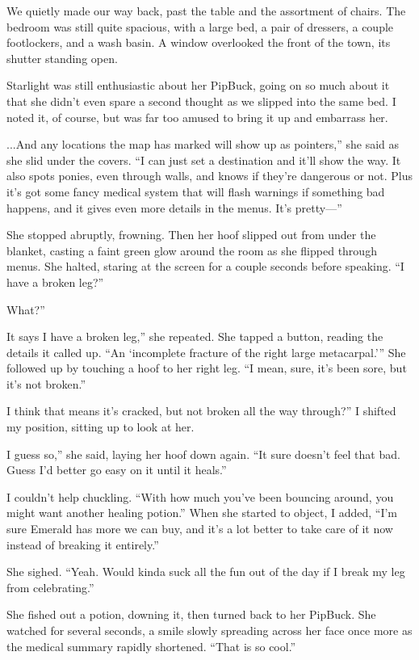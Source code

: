 We quietly made our way back, past the table and the assortment of chairs. The bedroom was still quite spacious, with a large bed, a pair of dressers, a couple footlockers, and a wash basin. A window overlooked the front of the town, its shutter standing open.

Starlight was still enthusiastic about her PipBuck, going on so much about it that she didn’t even spare a second thought as we slipped into the same bed. I noted it, of course, but was far too amused to bring it up and embarrass her.

\leavevmode{}...And any locations the map has marked will show up as pointers,” she said as she slid under the covers. “I can just set a destination and it’ll show the way. It also spots ponies, even through walls, and knows if they’re dangerous or not. Plus it’s got some fancy medical system that will flash warnings if something bad happens, and it gives even more details in the menus. It’s pretty—”

She stopped abruptly, frowning. Then her hoof slipped out from under the blanket, casting a faint green glow around the room as she flipped through menus. She halted, staring at the screen for a couple seconds before speaking. “I have a broken leg?”

\leavevmode{}What?”

\leavevmode{}It says I have a broken leg,” she repeated. She tapped a button, reading the details it called up. “An ‘incomplete fracture of the right large metacarpal.’” She followed up by touching a hoof to her right leg. “I mean, sure, it’s been sore, but it’s not broken.”

\leavevmode{}I think that means it’s cracked, but not broken all the way through?” I shifted my position, sitting up to look at her.

\leavevmode{}I guess so,” she said, laying her hoof down again. “It sure doesn’t feel that bad. Guess I’d better go easy on it until it heals.”

I couldn’t help chuckling. “With how much you’ve been bouncing around, you might want another healing potion.” When she started to object, I added, “I’m sure Emerald has more we can buy, and it’s a lot better to take care of it now instead of breaking it entirely.”

She sighed. “Yeah. Would kinda suck all the fun out of the day if I break my leg from celebrating.”

She fished out a potion, downing it, then turned back to her PipBuck. She watched for several seconds, a smile slowly spreading across her face once more as the medical summary rapidly shortened. “That is so cool.”

